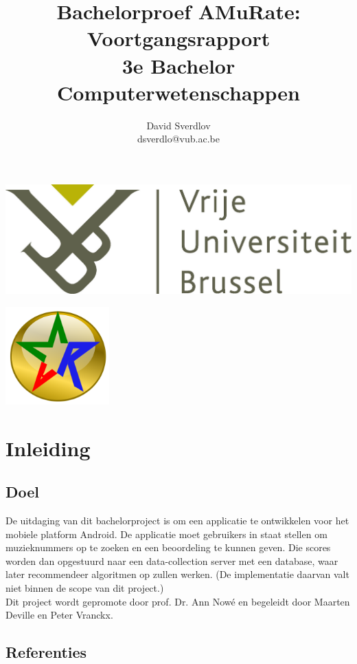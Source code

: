 \documentclass[11pt,a4paper]{article}
\author{David Sverdlov \\ dsverdlo@vub.ac.be}
\title{Bachelorproef AMuRate: Voortgangsrapport\\ 3e Bachelor Computerwetenschappen}
\begin{document}
\begin{flushleft}
\noindent \includegraphics[width=0.6\linewidth]{vub_logo.jpg} 
\end{flushleft}
{\let\newpage\relax\maketitle} %

\begin{center}
\includegraphics[width=4cm]{amr_gold_thick.png} 
\end{center}



\newpage
\tableofcontents

\newpage
\section{Inleiding}
	\subsection{Doel}
De uitdaging van dit bachelorproject is om een applicatie te ontwikkelen voor het mobiele platform Android. De applicatie moet gebruikers in staat stellen om muzieknummers op te zoeken en een beoordeling te kunnen geven. Die scores worden dan opgestuurd naar een data-collection server met een database, waar later recommendeer algoritmen op zullen werken. (De implementatie daarvan valt niet binnen de scope van dit project.) \\
Dit project wordt gepromote door prof. Dr. Ann Nowé en begeleidt door Maarten Deville en Peter Vranckx. 

	\subsection{Referenties}
\end{document}
